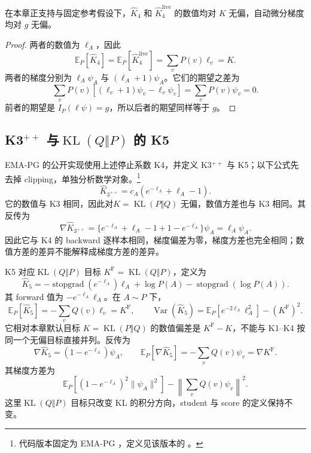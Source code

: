 \documentclass[lang=cn,scheme=chinese,openany]{../book/elegantbook}
\newcommand{\E}{\mathbb E}
\newcommand{\KL}{\operatorname{KL}}
\newcommand{\Var}{\operatorname{Var}}
\newcommand{\sg}{\operatorname{stopgrad}}
\begin{document}
\begin{theorem}[K4 的数值与梯度无偏性]
\label{est:thm:k4}
在本章正支持与固定参考假设下，$\widehat K_4$ 和 $\widehat K_4^{\mathrm{live}}$ 的数值均对 $K$ 无偏，自动微分梯度均对 $g$ 无偏。
\end{theorem}
\begin{proof}
两者的数值为 $\ell_A$，因此
\begin{equation}
\E_P[\widehat K_4]=\E_P[\widehat K_4^{\mathrm{live}}]=\sum_vP(v)\ell_v=K.
\end{equation}
两者的梯度分别为 $\ell_A\psi_A$ 与 $(\ell_A+1)\psi_A$。它们的期望之差为
\begin{equation}
\sum_vP(v)[(\ell_v+1)\psi_v-\ell_v\psi_v]=\sum_vP(v)\psi_v=0.
\end{equation}
前者的期望是 $I_P(\ell\psi)=g$，所以后者的期望同样等于 $g$。
\end{proof}

\subsection{K3$^{++}$ 与$\KL(Q\Vert P)$ 的 K5}

EMA-PG 的公开实现使用上述停止系数 K4，并定义 K3$^{++}$ 与 K5；以下公式先去掉 clipping，单独分析数学对象。\footnote{代码版本固定为 EMA-PG ，定义见该版本的 \href{https://github.com/LunjunZhang/ema-pg/blob/f9b977632ad948ce935432a517c22291bfaba562/search/verl/trainer/ppo/core_algos.py}{}。}
\begin{equation*}
 \widehat K_{3^{++}}=c_A(e^{-\ell_A}+\ell_A-1).
\end{equation*}
它的数值与 K3 相同，因此对$K=\KL(P\Vert Q)$ 无偏，数值方差也与 K3 相同。其反传为
\begin{equation*}
 \nabla\widehat K_{3^{++}}
 =\{e^{-\ell_A}+\ell_A-1+1-e^{-\ell_A}\}\psi_A=\ell_A\psi_A.
\end{equation*}
因此它与 K4 的 backward 逐样本相同，梯度偏差为零，梯度方差也完全相同；数值方差的差异不能解释成梯度方差的差异。

K5 对应$\KL(Q\Vert P)$ 目标 $K^{\mathrm F}=\KL(Q\Vert P)$，定义为
\begin{equation*}
 \widehat K_5=-\sg(e^{-\ell_A})\ell_A+\log P(A)-\sg(\log P(A)).
\end{equation*}
其 forward 值为 $-e^{-\ell_A}\ell_A$。在 $A\sim P$ 下，
\begin{equation*}
 \E_P[\widehat K_5]=-\sum_vQ(v)\ell_v=K^{\mathrm F},\qquad
 \Var(\widehat K_5)=\E_P[e^{-2\ell_A}\ell_A^2]-(K^{\mathrm F})^2.
\end{equation*}
它相对本章默认目标 $K=\KL(P\Vert Q)$ 的数值偏差是 $K^{\mathrm F}-K$，不能与 K1--K4 按同一个无偏目标直接并列。反传为
\begin{equation*}
 \nabla\widehat K_5=(1-e^{-\ell_A})\psi_A,\qquad
 \E_P[\nabla\widehat K_5]=-\sum_vQ(v)\psi_v=\nabla K^{\mathrm F}.
\end{equation*}
其梯度方差为
\begin{equation*}
 \E_P[(1-e^{-\ell_A})^2\lVert \psi_A\rVert^2]
 -\left\lVert\sum_vQ(v)\psi_v\right\rVert^2.
\end{equation*}
这里$\KL(Q\Vert P)$ 目标只改变 KL 的积分方向，student 与 score 的定义保持不变。
\end{document}
